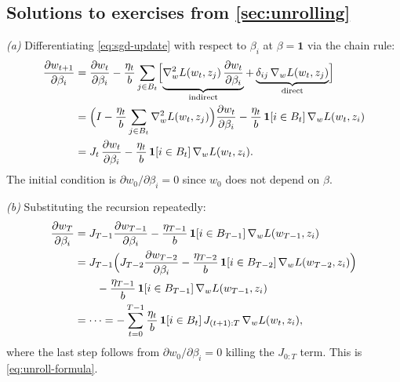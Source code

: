 \begin{pdfonly}\begin{solutionsonly}
\subsection{Solutions to exercises from \cref{sec:unrolling}}
\end{solutionsonly}\end{pdfonly}

\begin{solution}

\textit{(a)} Differentiating \eqref{eq:sgd-update} with respect to $\beta_i$ at $\beta = \mathbf{1}$ via the chain rule:
\begin{align*}
  \frac{\partial w_{t+1}}{\partial \beta_i} &= \frac{\partial w_t}{\partial \beta_i} - \frac{\eta_t}{b}\sum_{j\in B_t}\Bigl[\underbrace{\nabla_w^2 L(w_t,z_j)\,\frac{\partial w_t}{\partial \beta_i}}_{\text{indirect}} + \underbrace{\delta_{ij}\,\nabla_w L(w_t,z_j)}_{\text{direct}}\Bigr] \\
  &= \Bigl(I - \frac{\eta_t}{b}\sum_{j\in B_t}\nabla_w^2 L(w_t,z_j)\Bigr)\frac{\partial w_t}{\partial \beta_i} - \frac{\eta_t}{b}\,\mathbf{1}[i\in B_t]\,\nabla_w L(w_t,z_i) \\
  &= J_t\,\frac{\partial w_t}{\partial \beta_i} - \frac{\eta_t}{b}\,\mathbf{1}[i\in B_t]\,\nabla_w L(w_t,z_i).
\end{align*}
The initial condition is $\partial w_0/\partial \beta_i = 0$ since $w_0$ does not depend on $\beta$.

\textit{(b)} Substituting the recursion repeatedly:
\begin{align*}
  \frac{\partial w_T}{\partial \beta_i} &= J_{T-1}\frac{\partial w_{T-1}}{\partial \beta_i} - \frac{\eta_{T-1}}{b}\,\mathbf{1}[i\in B_{T-1}]\,\nabla_w L(w_{T-1},z_i) \\
  &= J_{T-1}\Bigl(J_{T-2}\frac{\partial w_{T-2}}{\partial \beta_i} - \frac{\eta_{T-2}}{b}\,\mathbf{1}[i\in B_{T-2}]\,\nabla_w L(w_{T-2},z_i)\Bigr) \\
  &\qquad - \frac{\eta_{T-1}}{b}\,\mathbf{1}[i\in B_{T-1}]\,\nabla_w L(w_{T-1},z_i) \\
  &= \cdots = -\sum_{t=0}^{T-1}\frac{\eta_t}{b}\,\mathbf{1}[i\in B_t]\,J_{(t+1):T}\,\nabla_w L(w_t,z_i),
\end{align*}
where the last step follows from $\partial w_0/\partial \beta_i = 0$ killing the $J_{0:T}$ term. This is \eqref{eq:unroll-formula}.


\end{solution}
